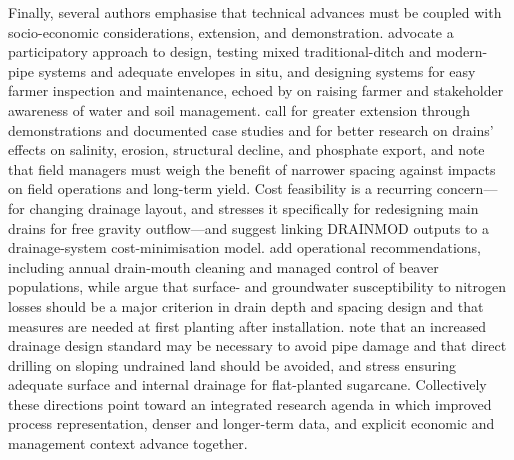 \documentclass[11pt]{article}
\begin{document}
Finally, several authors emphasise that technical advances must be coupled with
socio-economic considerations, extension, and demonstration.
\textcite{BenAissa2013} advocate a participatory approach to design, testing
mixed traditional-ditch and modern-pipe systems and adequate envelopes in situ,
and designing systems for easy farmer inspection and maintenance, echoed by
\textcite{HajAmor2019} on raising farmer and stakeholder awareness of water and
soil management. \textcite{MCFARLANE1992} call for greater extension through
demonstrations and documented case studies and for better research on drains'
effects on salinity, erosion, structural decline, and phosphate export, and
\textcite{Mante2018} note that field managers must weigh the benefit of
narrower spacing against impacts on field operations and long-term yield.
Cost feasibility is a recurring concern---for changing drainage layout, and
\textcite{Imran2021} stresses it specifically for redesigning main drains for
free gravity outflow---and \textcite{Malota2015} suggest linking DRAINMOD
outputs to a drainage-system cost-minimisation model. \textcite{Lamsodis2011}
add operational recommendations, including annual drain-mouth cleaning and
managed control of beaver populations, while \textcite{DarziNaftchali2017}
argue that surface- and groundwater susceptibility to nitrogen losses should be
a major criterion in drain depth and spacing design and that measures are
needed at first planting after installation. \textcite{HARRIS1993} note that
an increased drainage design standard may be necessary to avoid pipe damage and
that direct drilling on sloping undrained land should be avoided, and
\textcite{CAMP1982} stress ensuring adequate surface and internal drainage for
flat-planted sugarcane. Collectively these directions point toward an
integrated research agenda in which improved process representation, denser and
longer-term data, and explicit economic and management context advance
together.

\printbibliography
\end{document}
